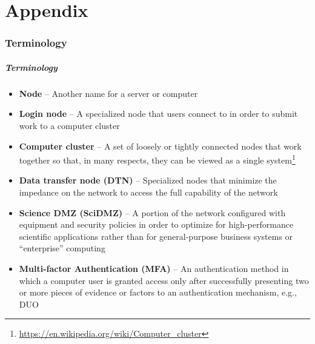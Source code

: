 \part{Appendix}

\section[Terminology]{Terminology}

\begin{frame}
	\frametitle{Terminology}
	\begin{itemize}
	\item \textbf{Node} -- Another name for a server or computer
        \item \textbf{Login node} -- A specialized node that users connect to in order to submit work to a computer cluster
        \item \textbf{Computer cluster} -- A set of loosely or tightly connected nodes that work together so that, in many respects, they can be viewed as a single system\footnote{\label{wiki_ccluster}\tiny\url{https://en.wikipedia.org/wiki/Computer_cluster}}
        \item \textbf{Data transfer node (DTN)} -- Specialized nodes that minimize the impedance on the network to access the full capability of the network
	\item \textbf{Science DMZ (SciDMZ)} --  A portion of the network configured with equipment and security policies in order to optimize for high-performance scientific applications rather than for general-purpose business systems or “enterprise” computing 
	\item \textbf{Multi-factor Authentication (MFA)} -- An authentication method in which a computer user is granted access only after successfully presenting two or more pieces of evidence or factors to an authentication mechanism, e.g., DUO

	\end{itemize}
\end{frame}

